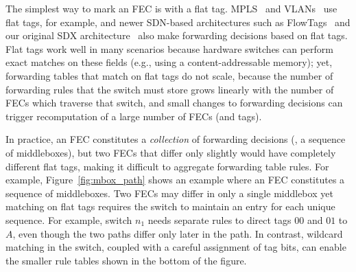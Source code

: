 The simplest way to mark an FEC is with a flat tag.  MPLS~\cite{mpls}
and VLANs~\cite{vlan} use flat tags, for example, and newer SDN-based
architectures such as FlowTags~\cite{flowtags} and our original SDX
architecture~\cite{sdx} also make forwarding decisions based on flat
tags.  Flat tags work well in many scenarios because hardware switches
can perform exact matches on these fields (e.g., using a
content-addressable memory); yet, forwarding tables that match on flat
tags do not scale, because the number of forwarding rules that the
switch must store grows linearly with the number of FECs which
traverse that switch, and small changes to forwarding decisions can
trigger recomputation of a large number of FECs (and tags).

In practice, an FEC constitutes a \emph{collection} of forwarding
decisions (\eg, a sequence of middleboxes), but two FECs that differ
only slightly would have completely different flat tags, making it
difficult to aggregate forwarding table rules.  For example,
Figure~\ref{fig:mbox_path} shows an example where an FEC constitutes a
sequence of middleboxes.  Two FECs may differ in only a single
middlebox yet matching on flat tags requires the switch to maintain an
entry for each unique sequence.  For example, switch $n_1$ needs
separate rules to direct tags $00$ and $01$ to $A$, even though the
two paths differ only later in the path.  In contrast, wildcard
matching in the switch, coupled with a careful assignment of tag bits,
can enable the smaller rule tables shown in the bottom of the figure.






